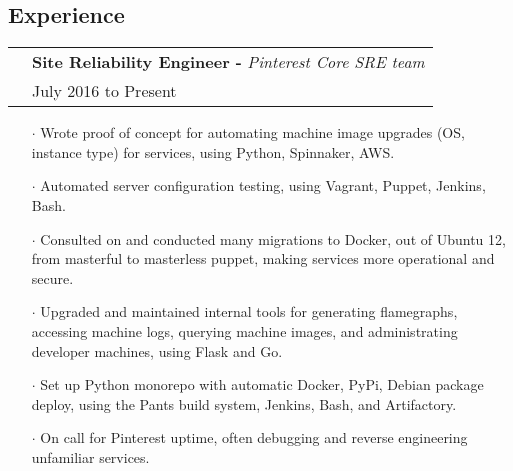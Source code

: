 \documentclass[letterpaper, oneside, final]{scrartcl} %
\newcommand{\gray}{\rowcolor[gray]{.90}} %
\begin{document}
\begin{center}

\vspace{-0.8cm}

\section{Experience}

\renewcommand{\arraystretch}{1.3}

\begin{tabularx}{0.97\linewidth}{>{\raggedleft\scshape}p{0cm}X}
\gray & \textbf{Site Reliability Engineer -} \textit{Pinterest Core SRE team}\\
\gray & {July 2016 to Present}\\
\end{tabularx}
\vspace{-0.1cm}
\begin{itemize} \itemsep-0.2cm
\item[$\cdot$] Wrote proof of concept for automating machine image upgrades (OS, instance type) for services, using Python, Spinnaker, AWS.\\
\item[$\cdot$] Automated server configuration testing, using Vagrant, Puppet, Jenkins, Bash.\\
\item[$\cdot$] Consulted on and conducted many migrations to Docker, out of Ubuntu 12, from masterful to masterless puppet, making services more operational and secure.\\
\item[$\cdot$] Upgraded and maintained internal tools for generating flamegraphs, accessing machine logs, querying machine images, and administrating developer machines, using Flask and Go.\\
\item[$\cdot$] Set up Python monorepo with automatic Docker, PyPi, Debian package deploy, using the Pants build system, Jenkins, Bash, and Artifactory.\\
\item[$\cdot$] On call for Pinterest uptime, often debugging and reverse engineering unfamiliar services.\\
\end{itemize}


\end{center}
\end{document}
